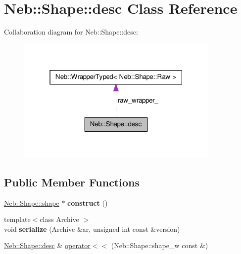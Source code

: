 \hypertarget{classNeb_1_1Shape_1_1desc}{\section{\-Neb\-:\-:\-Shape\-:\-:desc \-Class \-Reference}
\label{classNeb_1_1Shape_1_1desc}
}


\-Collaboration diagram for \-Neb\-:\-:\-Shape\-:\-:desc\-:\nopagebreak
\begin{figure}[H]
\begin{center}
\leavevmode
\includegraphics[width=280pt]{classNeb_1_1Shape_1_1desc__coll__graph}
\end{center}
\end{figure}
\subsection*{\-Public \-Member \-Functions}
\begin{DoxyCompactItemize}
\item 
\hypertarget{classNeb_1_1Shape_1_1desc_aec54e9d9db3edfb8c2b9a137448de64b}{\hyperlink{classNeb_1_1Shape_1_1shape}{\-Neb\-::\-Shape\-::shape} $\ast$ {\bfseries construct} ()}\label{classNeb_1_1Shape_1_1desc_aec54e9d9db3edfb8c2b9a137448de64b}

\item 
\hypertarget{classNeb_1_1Shape_1_1desc_a88bfba50969272baa492ffe519f39b8d}{{\footnotesize template$<$class Archive $>$ }\\void {\bfseries serialize} (\-Archive \&ar, unsigned int const \&version)}\label{classNeb_1_1Shape_1_1desc_a88bfba50969272baa492ffe519f39b8d}

\item 
\hyperlink{classNeb_1_1Shape_1_1desc}{\-Neb\-::\-Shape\-::desc} \& \hyperlink{classNeb_1_1Shape_1_1desc_a8356295ceee1f17dd24afbdb455dd206}{operator$<$$<$} (\-Neb\-::\-Shape\-::shape\-\_\-w const \&)
\end{DoxyCompactItemize}
